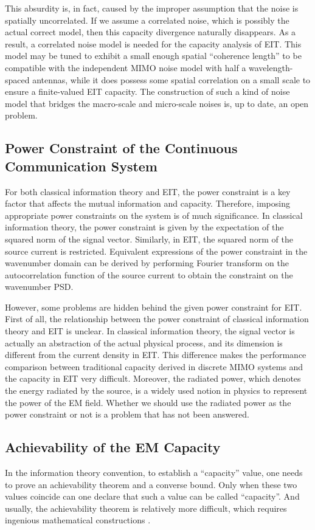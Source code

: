 \documentclass[journal,twocolumn]{IEEEtran}
\begin{document}
This absurdity is, in fact, caused by the improper assumption that the noise is spatially uncorrelated. If we assume a correlated noise, which is possibly the actual correct model, then this capacity divergence naturally disappears. 
As a result, a correlated noise model is needed for the capacity analysis of EIT. This model may be tuned to exhibit a small enough spatial ``coherence length'' to be compatible with the independent  MIMO noise model with half a wavelength-spaced antennas, while it does possess some spatial correlation on a small scale to ensure a finite-valued EIT capacity. 
The construction of such a kind of noise model that bridges the macro-scale and micro-scale noises is, up to date, an open problem. 

\subsection{Power Constraint of the Continuous Communication System}
For both classical information theory and EIT, the power constraint is a key factor that affects the mutual information and capacity. Therefore, imposing appropriate power constraints on the system is of much significance. In classical information theory, the power constraint is given by the expectation of the squared norm of the signal vector.  Similarly, in EIT, the squared norm of the source current is restricted. Equivalent expressions of the power constraint in the wavenumber domain can be derived by performing Fourier transform on the autocorrelation function of the source current to obtain the constraint on the wavenumber PSD. 

However, some problems are hidden behind the given power constraint for EIT. First of all, the relationship between the power constraint of classical information theory and EIT is unclear. In classical information theory, the signal vector is actually an abstraction of the actual physical process, and its dimension is different from the current density in EIT. This difference makes the performance comparison between traditional capacity derived in discrete MIMO systems and the capacity in EIT very difficult. Moreover, the radiated power, which denotes the energy radiated by the source, is a widely used notion in physics to represent the power of the EM field. Whether we should use the radiated power as the power constraint or not is a problem that has not been answered.


\subsection{Achievability of the EM Capacity}
In the information theory convention, to establish a ``capacity'' value, one needs to prove an achievability theorem and a converse bound. Only when these two values coincide can one declare that such a value can be called ``capacity''. And usually, the achievability theorem is relatively more difficult, which requires ingenious mathematical constructions \cite{shannon1948mathematical}. 
\end{document}
